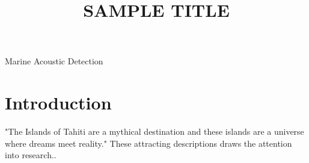 \documentclass[12pt,journal,onecolumn]{IEEEtran}
\begin{document}
\title{\textbf{SAMPLE TITLE}}

{Marine Acoustic Detection} %
\maketitle



\patchcmd{\section}{\centering}{\raggedright}{}{} %
\patchcmd{\section}{\normalsize}{\large\bfseries}{}{} %

\section{Introduction}

"The Islands of Tahiti are a mythical destination and these islands are a universe where dreams meet reality." These attracting descriptions draws the attention into research.\cite{populationref}.
\end{document}
